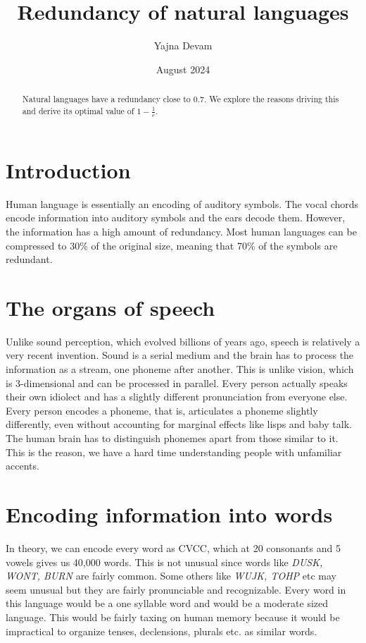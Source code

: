 \documentclass{article}
\title{Redundancy of natural languages}
\author{Yajna Devam}
\date{August 2024}
\begin{document}
\maketitle

\begin{abstract}
    Natural languages have a redundancy close to 0.7. We explore the reasons driving this and derive its optimal value of $1 - \frac{1}{e}$.
\end{abstract}

\section{Introduction}

Human language is essentially an encoding of auditory symbols. The vocal chords encode information into auditory symbols and the ears decode them. However, the information has a high amount of redundancy. Most human languages can be compressed to 30\% of the original size, meaning that 70\% of the symbols are redundant.

\section{The organs of speech}
Unlike sound perception, which evolved billions of years ago, speech is relatively a very recent invention. Sound is a serial medium and the brain has to process the information as a stream, one phoneme after another. This is unlike vision, which is 3-dimensional and can be processed in parallel. Every person actually speaks their own idiolect and has a slightly different pronunciation from everyone else. Every person encodes a phoneme, that is, articulates a phoneme slightly differently, even without accounting for marginal effects like lisps and baby talk. The human brain has to distinguish phonemes apart from those similar to it. This is the reason, we have a hard time understanding people with unfamiliar accents.

\section{Encoding information into words}
In theory, we can encode every word as CVCC, which at 20 consonants and 5 vowels gives us 40,000 words. This is not unusual since words like \emph{DUSK, WONT, BURN} are fairly common. Some others like \emph{WUJK, TOHP} etc may seem unusual but they are fairly pronunciable and recognizable. Every word in this language would be a one syllable word and would be a moderate sized language. This would be fairly taxing on human memory because it would be impractical to organize tenses, declensions, plurals etc. as similar words.
\end{document}
